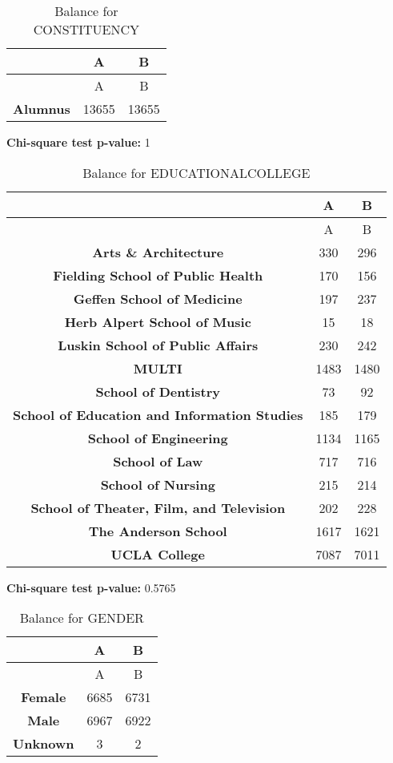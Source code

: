 \documentclass[
]{article}
\begin{document}
\begin{longtable}[]{@{}ccc@{}}
\caption{Balance for CONSTITUENCY}\tabularnewline
\toprule\noalign{}
~ & A & B \\
\midrule\noalign{}
\endfirsthead
\toprule\noalign{}
~ & A & B \\
\midrule\noalign{}
\endhead
\bottomrule\noalign{}
\endlastfoot
\textbf{Alumnus} & 13655 & 13655 \\
\end{longtable}

\textbf{Chi-square test p-value:} 1\\
\pagebreak

\begin{longtable}[]{@{}ccc@{}}
\caption{Balance for EDUCATIONALCOLLEGE}\tabularnewline
\toprule\noalign{}
~ & A & B \\
\midrule\noalign{}
\endfirsthead
\toprule\noalign{}
~ & A & B \\
\midrule\noalign{}
\endhead
\bottomrule\noalign{}
\endlastfoot
\textbf{Arts \& Architecture} & 330 & 296 \\
\textbf{Fielding School of Public Health} & 170 & 156 \\
\textbf{Geffen School of Medicine} & 197 & 237 \\
\textbf{Herb Alpert School of Music} & 15 & 18 \\
\textbf{Luskin School of Public Affairs} & 230 & 242 \\
\textbf{MULTI} & 1483 & 1480 \\
\textbf{School of Dentistry} & 73 & 92 \\
\textbf{School of Education and Information Studies} & 185 & 179 \\
\textbf{School of Engineering} & 1134 & 1165 \\
\textbf{School of Law} & 717 & 716 \\
\textbf{School of Nursing} & 215 & 214 \\
\textbf{School of Theater, Film, and Television} & 202 & 228 \\
\textbf{The Anderson School} & 1617 & 1621 \\
\textbf{UCLA College} & 7087 & 7011 \\
\end{longtable}

\textbf{Chi-square test p-value:} 0.5765\\
\pagebreak

\begin{longtable}[]{@{}ccc@{}}
\caption{Balance for GENDER}\tabularnewline
\toprule\noalign{}
~ & A & B \\
\midrule\noalign{}
\endfirsthead
\toprule\noalign{}
~ & A & B \\
\midrule\noalign{}
\endhead
\bottomrule\noalign{}
\endlastfoot
\textbf{Female} & 6685 & 6731 \\
\textbf{Male} & 6967 & 6922 \\
\textbf{Unknown} & 3 & 2 \\
\end{longtable}
\end{document}
